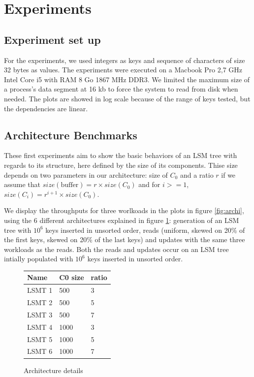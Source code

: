 \documentclass{sig-alternate-05-2015}
\begin{document}
\section{Experiments}
\subsection{Experiment set up}

For the experiments, we used integers as keys and sequence of characters of size 32 bytes as values. The experiments were executed on a Macbook Pro 2,7 GHz Intel Core i5 with RAM 8 Go 1867 MHz DDR3. We limited the maximum size of a process's data segment at 16 kb to force the system to read from disk when needed. The plots are showed in log scale because of the range of keys tested, but the dependencies are linear.


\subsection{Architecture Benchmarks}

These first experiments aim to show the basic behaviors of an LSM tree with regards to its structure, here defined by the size of its components. Thise size depends on two parameters in our architecture: size of $C_0$ and a ratio $r$ if we assume that $size(\text{buffer}) = r \times size( C_0)$ and for $i>= 1$, $size(C_i) = r^{i+1} \times size(C_0)$.

We display the throughputs for three worlkoads in the plots in figure \ref{fig:archi}, using the 6 different architectures explained in figure \ref{fig:details}: generation of an LSM tree with $10^6$ keys inserted in unsorted order, reads (uniform, skewed on 20\% of the first keys, skewed on 20\% of the last keys) and updates with the same three workloads as the reads. Both the reads and updates occur on an LSM tree intially populated with $10^6$ keys inserted in unsorted order.

\begin{figure}
\centering
\begin{tabular}{|l|l|l|}
\hline
Name   & C0 size & ratio \\ \hline
LSMT 1 & 500     & 3     \\ \hline
LSMT 2 & 500     & 5     \\ \hline
LSMT 3 & 500     & 7     \\ \hline
LSMT 4 & 1000    & 3     \\ \hline
LSMT 5 & 1000    & 5     \\ \hline
LSMT 6 & 1000    & 7     \\ \hline
\end{tabular}
\caption{Architecture details}
\label{fig:details}
\end{figure}
\end{document}

